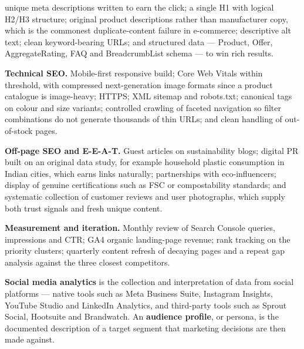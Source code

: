\begin{qlist}
\begin{apts}
      unique meta descriptions written to earn the click; a single H1 with
      logical H2/H3 structure; original product descriptions rather than
      manufacturer copy, which is the commonest duplicate-content failure in
      e-commerce; descriptive alt text; clean keyword-bearing URLs; and
      structured data --- Product, Offer, AggregateRating, FAQ and
      BreadcrumbList schema --- to win rich results.
\item \textbf{Technical SEO.} Mobile-first responsive build; Core Web Vitals
      within threshold, with compressed next-generation image formats since a
      product catalogue is image-heavy; HTTPS; XML sitemap and robots.txt;
      canonical tags on colour and size variants; controlled crawling of
      faceted navigation so filter combinations do not generate thousands of
      thin URLs; and clean handling of out-of-stock pages.
\item \textbf{Off-page SEO and E-E-A-T.} Guest articles on sustainability
      blogs; digital PR built on an original data study, for example household
      plastic consumption in Indian cities, which earns links naturally;
      partnerships with eco-influencers; display of genuine certifications
      such as FSC or compostability standards; and systematic collection of
      customer reviews and user photographs, which supply both trust signals
      and fresh unique content.
\item \textbf{Measurement and iteration.} Monthly review of Search Console
      queries, impressions and CTR; GA4 organic landing-page revenue; rank
      tracking on the priority clusters; quarterly content refresh of decaying
      pages and a repeat gap analysis against the three closest competitors.
\end{apts}

\textbf{Social media analytics} is the collection and interpretation of data
from social platforms --- native tools such as Meta Business Suite, Instagram
Insights, YouTube Studio and LinkedIn Analytics, and third-party tools such as
Sprout Social, Hootsuite and Brandwatch. An \textbf{audience profile}, or
persona, is the documented description of a target segment that marketing
decisions are then made against.


\end{qlist}
